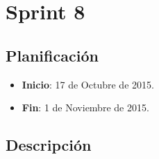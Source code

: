 \section{Sprint 8} %

\subsection{Planificación}
\begin{itemize}
    \item \textbf{Inicio}: 17 de Octubre de 2015.
    \item \textbf{Fin}: 1 de Noviembre de 2015.
\end{itemize}

\subsection{Descripción}

